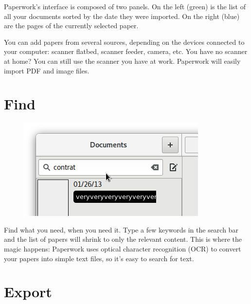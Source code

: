 \documentclass[10pt,a4paper]{article}
\begin{document}
Paperwork's interface is composed of two panels. On the left (green) is the
list of all your documents sorted by the date they were imported. On the right
(blue) are the pages of the currently selected paper.

You can add papers from several sources, depending on the devices connected
to your computer: scanner flatbed, scanner feeder, camera, etc. You have no
scanner at home? You can still use the scanner you have at work. Paperwork
will easily import PDF and image files.


\section{Find}

\begin{figure}
	\centering
	\vspace{-20pt}
	\includegraphics[scale=0.5]{data/paperwork_search.png}
\end{figure}

Find what you need, when you need it. Type a few keywords in the search
bar and the list of papers will shrink to only the relevant content. This
is where the magic happens: Paperwork uses optical character recognition
(OCR) to convert your papers into simple text files, so it's easy to
search for text.


\section{Export}
\end{document}
